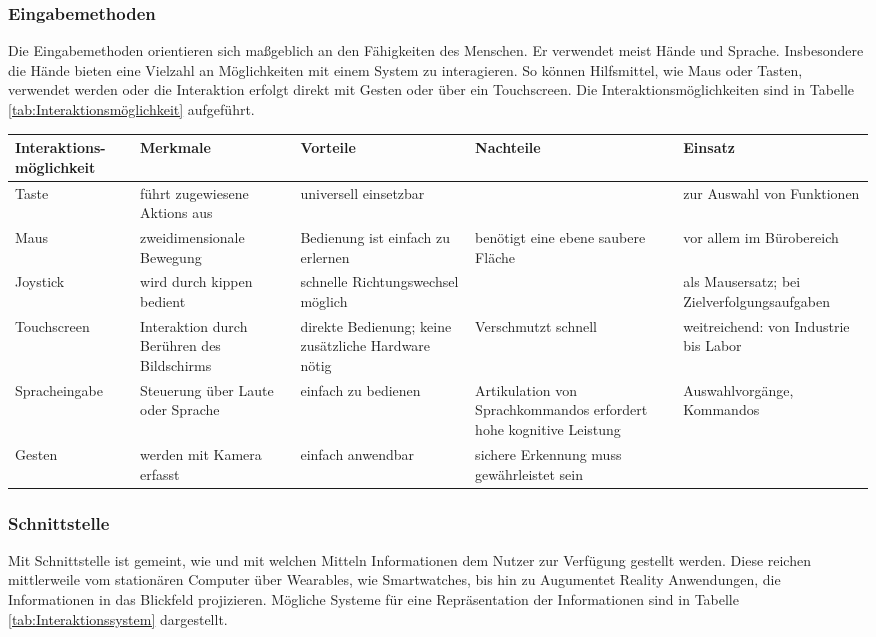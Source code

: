 \subsubsection*{Eingabemethoden}
\label{2:Eingabemethoden}
Die Eingabemethoden orientieren sich maßgeblich an den Fähigkeiten des Menschen. Er verwendet meist Hände und Sprache. Insbesondere die Hände bieten eine Vielzahl an Möglichkeiten mit einem System zu interagieren. So können Hilfsmittel, wie Maus oder Tasten, verwendet werden oder die Interaktion erfolgt direkt mit Gesten oder über ein Touchscreen. Die Interaktionsmöglichkeiten sind in Tabelle \ref{tab:Interaktionsmöglichkeit} aufgeführt. \cite{Zuhlke2012, Heinecke2012}

\begin{sidewaystable}[ph!]
\caption{Interaktionsmöglichkeiten mit einem Assistenzsystem}
\begin{tabular}{p{3cm}|p{3cm}|p{}|p{}|p{}}
	\textbf{Interaktions-möglichkeit} & \textbf{Merkmale} & \textbf{Vorteile} & \textbf{Nachteile} & \textbf{Einsatz} \\
	\hline
	Taste & führt zugewiesene Aktions aus & universell einsetzbar & & zur Auswahl von Funktionen \\
	\hline
	Maus & zweidimensionale Bewegung & Bedienung ist einfach zu erlernen & benötigt eine ebene saubere Fläche & vor allem im Bürobereich\\
	\hline
	Joystick & wird durch kippen bedient & schnelle Richtungswechsel möglich & & als Mausersatz; bei Zielverfolgungsaufgaben \\
	\hline
	Touchscreen & Interaktion durch Berühren des Bildschirms & direkte Bedienung; keine zusätzliche Hardware nötig & Verschmutzt schnell & weitreichend: von Industrie bis Labor \\
	\hline
	Spracheingabe & Steuerung über Laute oder Sprache & einfach zu bedienen & Artikulation von Sprachkommandos erfordert hohe kognitive Leistung & Auswahlvorgänge, Kommandos \\
	\hline
	Gesten & werden mit Kamera erfasst & einfach anwendbar & sichere Erkennung muss gewährleistet sein & \\
\end{tabular}
\label{tab:Interaktionsmöglichkeit}
\end{sidewaystable}

\subsubsection*{Schnittstelle}
\label{2:Schnittstelle}
Mit Schnittstelle ist gemeint, wie und mit welchen Mitteln Informationen dem Nutzer zur Verfügung gestellt werden. Diese reichen mittlerweile vom stationären Computer über Wearables, wie Smartwatches, bis hin zu Augumentet Reality Anwendungen, die Informationen in das Blickfeld projizieren. Mögliche Systeme für eine Repräsentation der Informationen sind in Tabelle \ref{tab:Interaktionssystem} dargestellt. \cite{Zuhlke2012, Kasselmann2016, Weidner2016, Ludwig}


